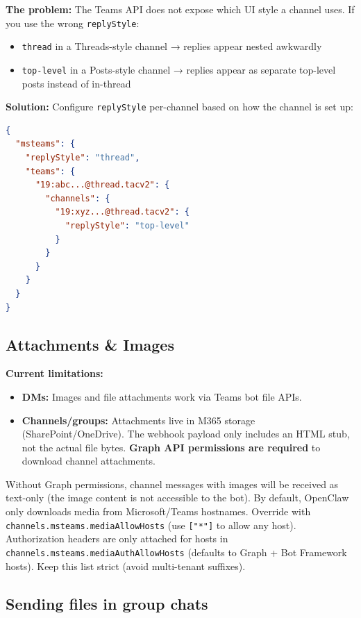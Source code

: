 \textbf{The problem:} The Teams API does not expose which UI style a channel uses. If you use the wrong \texttt{replyStyle}:

\begin{itemize}
  \item \texttt{thread} in a Threads-style channel → replies appear nested awkwardly
  \item \texttt{top-level} in a Posts-style channel → replies appear as separate top-level posts instead of in-thread
\end{itemize}


\textbf{Solution:} Configure \texttt{replyStyle} per-channel based on how the channel is set up:

\begin{lstlisting}[language=json]
{
  "msteams": {
    "replyStyle": "thread",
    "teams": {
      "19:abc...@thread.tacv2": {
        "channels": {
          "19:xyz...@thread.tacv2": {
            "replyStyle": "top-level"
          }
        }
      }
    }
  }
}
\end{lstlisting}


\subsection{Attachments \& Images}


\textbf{Current limitations:}

\begin{itemize}
  \item \textbf{DMs:} Images and file attachments work via Teams bot file APIs.
  \item \textbf{Channels/groups:} Attachments live in M365 storage (SharePoint/OneDrive). The webhook payload only includes an HTML stub, not the actual file bytes. \textbf{Graph API permissions are required} to download channel attachments.
\end{itemize}


Without Graph permissions, channel messages with images will be received as text-only (the image content is not accessible to the bot).
By default, OpenClaw only downloads media from Microsoft/Teams hostnames. Override with \texttt{channels.msteams.mediaAllowHosts} (use \texttt{["*"]} to allow any host).
Authorization headers are only attached for hosts in \texttt{channels.msteams.mediaAuthAllowHosts} (defaults to Graph + Bot Framework hosts). Keep this list strict (avoid multi-tenant suffixes).

\subsection{Sending files in group chats}


